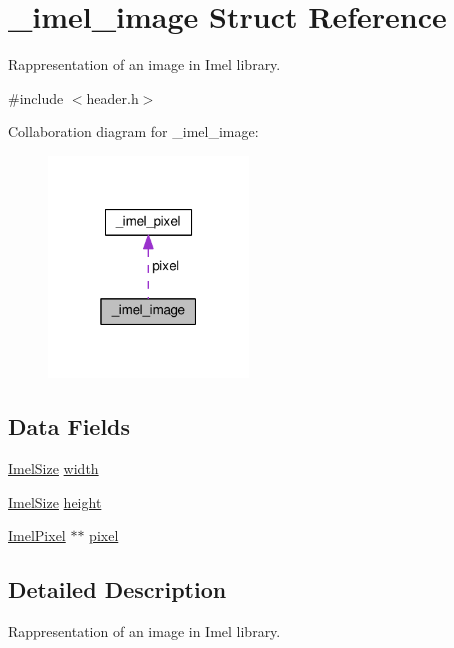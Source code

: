 \hypertarget{struct__imel__image}{}\section{\+\_\+imel\+\_\+image Struct Reference}
\label{struct__imel__image}


Rappresentation of an image in Imel library.  




{\ttfamily \#include $<$header.\+h$>$}



Collaboration diagram for \+\_\+imel\+\_\+image\+:
\nopagebreak
\begin{figure}[H]
\begin{center}
\leavevmode
\includegraphics[width=151pt]{struct__imel__image__coll__graph}
\end{center}
\end{figure}
\subsection*{Data Fields}
{\bf }\par
\begin{DoxyCompactItemize}
\item 
\hyperlink{header_8h_af8a2b40c34eeed326846d0098ea84ec2}{Imel\+Size} \hyperlink{struct__imel__image_a21d117461b6a449755cf1519e6360be5}{width}
\item 
\hyperlink{header_8h_af8a2b40c34eeed326846d0098ea84ec2}{Imel\+Size} \hyperlink{struct__imel__image_aac8aaaa7bd52f888126f05cf87d46531}{height}
\item 
\hyperlink{header_8h_add7dd9f8c093208bc4fd135a22a670ba}{Imel\+Pixel} $\ast$$\ast$ \hyperlink{struct__imel__image_a7a156b8fc30a034d713afb77d198f320}{pixel}
\end{DoxyCompactItemize}



\subsection{Detailed Description}
Rappresentation of an image in Imel library. 

